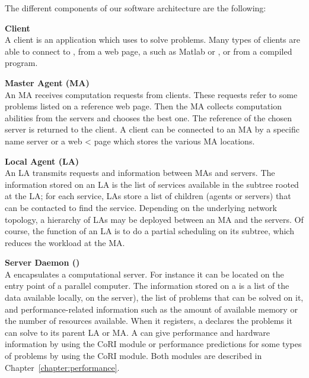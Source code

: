 The different components of our software architecture are the
following:

\begin{description}
\item \textbf{Client}\\ A client is an application which uses \diet to solve
  problems. Many types of clients are able to connect to \diet, from a
  web page, a \pse such as Matlab or \sci, or from a compiled program.
\item \textbf{Master Agent (MA)}\\ An MA receives computation requests from
  clients. These requests refer to some \diet problems listed on a reference
  web page. Then the MA collects computation abilities from the servers and
  chooses the best one. The reference of the chosen server is returned to the
  client. A client can be connected to an MA by a specific name server or a web
<  page which stores the various MA locations.

\item \textbf{Local Agent (LA)}\\ An LA transmits requests and information
  between MAs and servers.  The information stored on an LA is the list of
  services available in the subtree rooted at the LA; for each service, LAs
  store a list of children (agents or servers) that can be contacted to find
  the service. Depending on the underlying network topology, a hierarchy of LAs
  may be deployed between an MA and the servers. Of course, the function of an
  LA is to do a partial scheduling on its subtree, which reduces the workload
  at the MA.

\item \textbf{Server Daemon (\sed)}\\ A \sed encapsulates a computational
  server. For instance it can be located on the entry point of a parallel
  computer. The information stored on a \sed is a list of the data available
  locally, \ie on the server), the list of problems that can be solved on it,
  and performance-related information such as the amount of available memory or
  the number of resources available. When it registers, a \sed declares the
  problems it can solve to its parent LA or MA.  A \sed can give performance and
  hardware information by using the CoRI module or performance predictions for
  some types of problems by using the CoRI module.  Both modules are described
  in Chapter~\ref{chapter:performance}.

\end{description}

